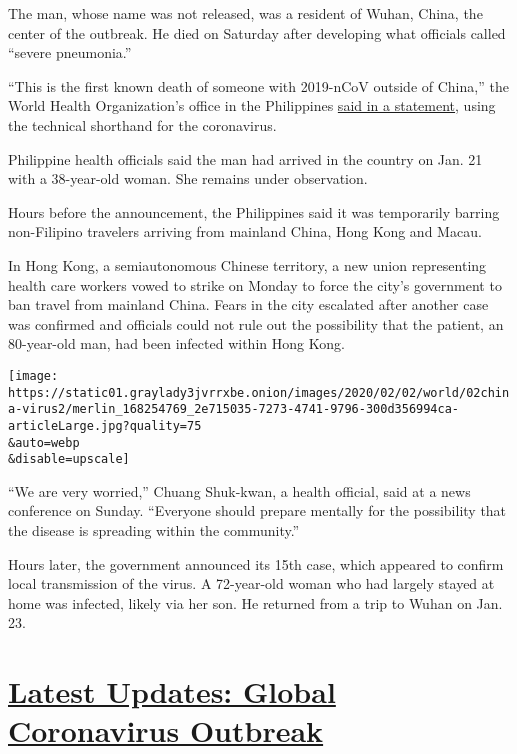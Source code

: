 The man, whose name was not released, was a resident of Wuhan, China,
the center of the outbreak. He died on Saturday after developing what
officials called ``severe pneumonia.''

``This is the first known death of someone with 2019-nCoV outside of
China,'' the World Health Organization's office in the Philippines
\href{https://www.facebookcorewwwi.onion/whophilippines/photos/a.514585071988103/2664930260286896/?type=3\&__xts__\%5B0\%5D=68.ARANVVlwrEFTML5lekIxBZNMqIbfrFgdiCrfveU-KkAfadCSrp4IBIqFDS02YQzuLERpt-CdtaoSjeg71-s8JN5syTzk8bnheLsSOOS0h5V3GR86fa3688BBhxMwuyaGe-IwatUH1sYDoUo-4BALQjKnvQDnewFAioKiQ3megPQRw7f-BcCbW1mChINqsYlEaUjMlMQYIVsHmdoCh-zZhGr5JfIXqmffJTWMtS66jfl-CoSoVu_pfaoBxBhAUenU1TCHQ5RXl6eqHI67HS_tT0S_DaW-TuMaO8ds0RKn7FBHgqn4EqkbQxJ_v0a-15TntvvUQV1UFa692Oqpkesg75PWmQ\&__tn__=-R}{said
in a statement}, using the technical shorthand for the coronavirus.

Philippine health officials said the man had arrived in the country on
Jan. 21 with a 38-year-old woman. She remains under observation.

Hours before the announcement, the Philippines said it was temporarily
barring non-Filipino travelers arriving from mainland China, Hong Kong
and Macau.

In Hong Kong, a semiautonomous Chinese territory, a new union
representing health care workers vowed to strike on Monday to force the
city's government to ban travel from mainland China. Fears in the city
escalated after another case was confirmed and officials could not rule
out the possibility that the patient, an 80-year-old man, had been
infected within Hong Kong.

\texttt{[image: https://static01.graylady3jvrrxbe.onion/images/2020/02/02/world/02china-virus2/merlin\_168254769\_2e715035-7273-4741-9796-300d356994ca-articleLarge.jpg?quality=75\\\&auto=webp\\\&disable=upscale]}

``We are very worried,'' Chuang Shuk-kwan, a health official, said at a
news conference on Sunday. ``Everyone should prepare mentally for the
possibility that the disease is spreading within the community.''

Hours later, the government announced its 15th case, which appeared to
confirm local transmission of the virus. A 72-year-old woman who had
largely stayed at home was infected, likely via her son. He returned
from a trip to Wuhan on Jan. 23.

\hypertarget{latest-updates-global-coronavirus-outbreak}{%
\section{\texorpdfstring{\href{https://www.nytimes3xbfgragh.onion/2020/08/04/world/coronavirus-covid-19.html?action=click\&pgtype=Article\&state=default\&region=MAIN_CONTENT_1\&context=storylines_live_updates}{Latest
Updates: Global Coronavirus
Outbreak}}{Latest Updates: Global Coronavirus Outbreak}}\label{latest-updates-global-coronavirus-outbreak}}

